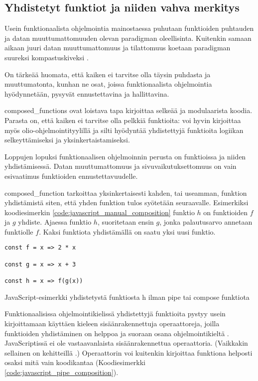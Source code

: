 \subsection{Yhdistetyt funktiot ja niiden vahva merkitys}

Usein funktionaalista ohjelmointia mainostaessa puhutaan funktioiden puhtauden ja datan muuttumattomuuden olevan paradigman oleellisinta. Kuitenkin samaan aikaan juuri datan muuttumattomuus ja tilattomuus koetaan paradigman suureksi kompastuskiveksi \cite{cantarella_fp_haitat,is_reduce_bad,vakil2016}.

On tärkeää huomata, että kaiken ei tarvitse olla täysin puhdasta ja muuttumatonta, kunhan ne osat, joissa funktionaalista ohjelmointia hyödynnetään, pysyvät ennustettavina ja hallittavina.

\Glspl{composed_function} ovat loistava tapa kirjoittaa selkeää ja modulaarista koodia. Parasta on, että kaiken ei tarvitse olla pelkkiä funktioita: voi hyvin kirjoittaa myös olio-ohjelmointityylillä ja silti hyödyntää yhdistettyjä funktioita logiikan selkeyttämiseksi ja yksinkertaistamiseksi.

Loppujen lopuksi funktionaalisen ohjelmoinnin perusta on funktioissa ja niiden yhdistämisessä. Datan muuttumattomuus ja sivuvaikutuksettomuus on vain esivaatimus funktioiden ennustettavuudelle.

\Gls{composed_function} tarkoittaa yksinkertaisesti kahden, tai useamman, funktion yhdistämistä siten, että yhden funktion tulos syötetään seuraavalle. Esimerkiksi koodiesimerkin \ref{code:javascript_manual_composition} funktio $h$ on funktioiden $f$ ja $g$ yhdiste. Ajaessa funktio $h$, suoritetaan ensin $g$, jonka palautusarvo annetaan funktiolle $f$. Kaksi funktiota yhdistämällä on saatu yksi uusi funktio.

\begin{code}
    \begin{verbatim}
const f = x => 2 * x

const g = x => x + 3

const h = x => f(g(x))
\end{verbatim}
    \caption{JavaScript-esimerkki yhdistetystä funktiosta h ilman pipe tai compose funktiota}
    \label{code:javascript_manual_composition}
\end{code}

Funktionaalisissa ohjelmointikielissä yhdistettyjä funktioita pystyy usein kirjoittamaan käyttäen kieleen sisäänrakennettuja operaattoreja, joilla funktioiden yhdistäminen on helppoa ja suoraan osana ohjelmointikieltä \cite{fsharpcomposition,haskellcomposition}.
JavaScriptissä ei ole vastaavanlaista sisäänrakennettua operaattoria.
(Vaikkakin sellainen on kehitteillä \cite{tc39_pipeline_operator}.)
Operaattorin voi kuitenkin kirjoittaa funktiona helposti osaksi mitä vain koodikantaa (Koodiesimerkki \ref{code:javascript_pipe_composition}).


